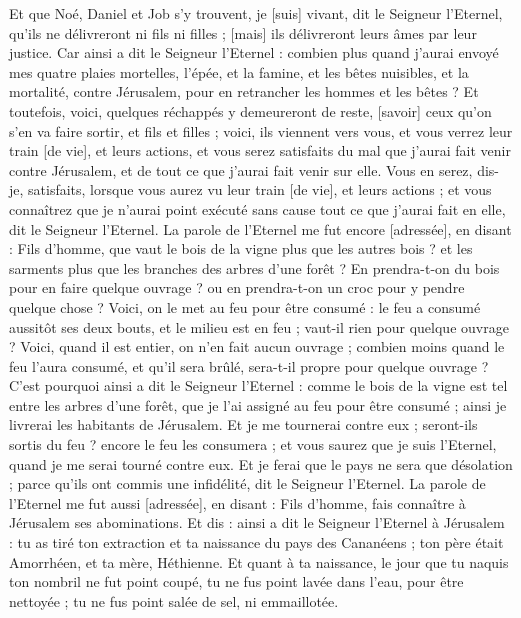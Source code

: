 \begin{multicols}{2}
Et que Noé, Daniel et Job s'y trouvent, je [suis] vivant, dit le Seigneur l'Eternel, qu'ils ne délivreront ni fils ni filles ; [mais] ils délivreront leurs âmes par leur justice.
Car ainsi a dit le Seigneur l'Eternel : combien plus quand j'aurai envoyé mes quatre plaies mortelles, l'épée, et la famine, et les bêtes nuisibles, et la mortalité, contre Jérusalem, pour en retrancher les hommes et les bêtes ?
Et toutefois, voici, quelques réchappés y demeureront de reste, [savoir] ceux qu'on s'en va faire sortir, et fils et filles ; voici, ils viennent vers vous, et vous verrez leur train [de vie], et leurs actions, et vous serez satisfaits du mal que j'aurai fait venir contre Jérusalem, et de tout ce que j'aurai fait venir sur elle.
Vous en serez, dis-je, satisfaits, lorsque vous aurez vu leur train [de vie], et leurs actions ; et vous connaîtrez que je n'aurai point exécuté sans cause tout ce que j'aurai fait en elle, dit le Seigneur l'Eternel.
\VerseOne{}La parole de l'Eternel me fut encore [adressée], en disant :
Fils d'homme, que vaut le bois de la vigne plus que les autres bois ? et les sarments plus que les branches des arbres d'une forêt ?
En prendra-t-on du bois pour en faire quelque ouvrage ? ou en prendra-t-on un croc pour y pendre quelque chose ?
Voici, on le met au feu pour être consumé : le feu a consumé aussitôt ses deux bouts, et le milieu est en feu ; vaut-il rien pour quelque ouvrage ?
Voici, quand il est entier, on n'en fait aucun ouvrage ; combien moins quand le feu l'aura consumé, et qu'il sera brûlé, sera-t-il propre pour quelque ouvrage ?
C'est pourquoi ainsi a dit le Seigneur l'Eternel : comme le bois de la vigne est tel entre les arbres d'une forêt, que je l'ai assigné au feu pour être consumé ; ainsi je livrerai les habitants de Jérusalem.
Et je me tournerai contre eux ; seront-ils sortis du feu ? encore le feu les consumera ; et vous saurez que je suis l'Eternel, quand je me serai tourné contre eux.
Et je ferai que le pays ne sera que désolation ; parce qu'ils ont commis une infidélité, dit le Seigneur l'Eternel.
\VerseOne{}La parole de l'Eternel me fut aussi [adressée], en disant :
Fils d'homme, fais connaître à Jérusalem ses abominations.
Et dis : ainsi a dit le Seigneur l'Eternel à Jérusalem : tu as tiré ton extraction et ta naissance du pays des Cananéens ; ton père était Amorrhéen, et ta mère, Héthienne.
Et quant à ta naissance, le jour que tu naquis ton nombril ne fut point coupé, tu ne fus point lavée dans l'eau, pour être nettoyée ; tu ne fus point salée de sel, ni emmaillotée.

\end{multicols}
